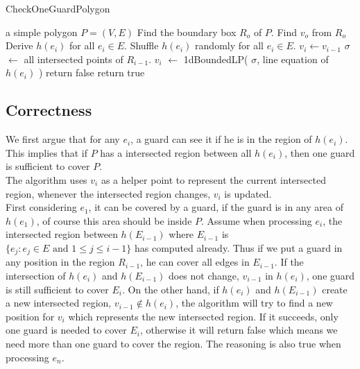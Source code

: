 \documentclass[12pt]{article}
\begin{document}
\begin{algorithm}[h]
  \caption{CheckOneGuardPolygon}
  \label{alg:OneGuardPolygon}
  \begin{algorithmic}
    \Require a simple polygon $P=(V,E)$
    \State Find the boundary box $R_o$ of $P$.
    \State Find $v_o$ from $R_o$
    \State Derive $h(e_i)$ for all $e_i \in E$.
    \State Shuffle $h(e_i)$ randomly for all $e_i \in E$.
        \State $v_i \leftarrow v_{i-1}$
        \Else
            \State $\sigma $ $\leftarrow$  all intersected points of $R_{i-1}$.
            \State $v_i$ $\leftarrow$ 1dBoundedLP( $\sigma$, line equation of $h(e_i)$ )
                \State return false
            \EndIf
        \EndIf
    \EndFor
    \State return true
  \end{algorithmic}
\end{algorithm}

\subsection*{Correctness}
We first argue that for any $e_i$, a guard can see it if he is in the region of $h(e_i)$.
This implies that if $P$ has a intersected region between all $h(e_i)$, then one guard is
sufficient to cover $P$. \\

The algorithm uses $v_i$ as a helper point to represent the current intersected region, whenever
the intersected region changes, $v_i$  is updated. \\

First considering $e_1$, it can be covered by a guard, if the guard is in any area of $h(e_1)$, of course this
area should be inside $P$. Assume when processing $e_i$, the intersected region between
$h(E_{i-1})$ where $E_{i-1}$ is $\{ e_j : e_j \in E \text{ and }1 \le j \le i -1 \} $ has computed already.
Thus if we put a guard in any position in the region $R_{i-1}$, he can cover all edges in $E_{i-1}$. If
the intersection of $h(e_i)$ and $h(E_{i-1})$ does not change, $v_{i-1}$ in $h(e_i)$,
one guard is still sufficient to cover $E_i$. On the other hand, if $h(e_i)$ and $h(E_{i-1})$ create
a new intersected region, $v_{i-1} \notin h(e_i)$, the algorithm will try to find a new position
for $v_i$ which represents the new intersected region. If it succeeds, only one guard
is needed to cover $E_i$, otherwise it will return false which means we need more
than one guard to cover the region. The reasoning is also true when processing  $e_n$. \\
\end{document}
